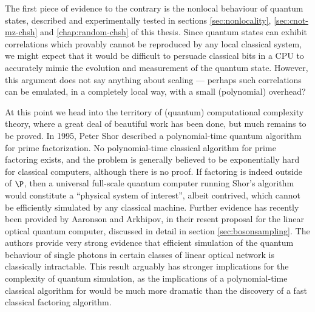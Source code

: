 The first piece of evidence to the contrary is the nonlocal behaviour of quantum states, described and experimentally tested in sections \ref{sec:nonlocality}, \ref{sec:cnot-mz-chsh} and \ref{chap:random-chsh} of this thesis. Since quantum states can exhibit correlations which provably cannot be reproduced by any local classical system, we might expect that it would be difficult to persuade classical bits in a CPU to accurately mimic the evolution and measurement of the quantum state. However, this argument does not say anything about scaling --- perhaps such correlations can be emulated, in a completely local way, with a small (polynomial) overhead? 

At this point we head into the territory of (quantum) computational complexity theory, where a great deal of beautiful work has been done, but much remains to be proved. In 1995, Peter Shor described \cite{Shor1995} a polynomial-time quantum algorithm for prime factorization. No polynomial-time classical algorithm for prime factoring exists, and the  problem is generally believed to be exponentially hard for classical computers, although there is no proof.  If factoring is indeed outside of $\P$, then a universal full-scale quantum computer running Shor's algorithm would constitute a ``physical system of interest'', albeit contrived, which cannot be efficiently simulated by any classical machine. Further evidence has recently been provided by Aaronson and Arkhipov, in their resent proposal for the \bosonsampling linear optical quantum computer, discussed in detail in section \ref{sec:bosonsampling}. The authors provide very strong evidence that efficient simulation of the quantum behaviour of single photons in certain classes of linear optical network is classically intractable. This result arguably has stronger implications for the complexity of quantum simulation, as the implications of a polynomial-time classical algorithm for \bosonsampling would be much more dramatic than the discovery of a fast classical factoring algorithm. 


